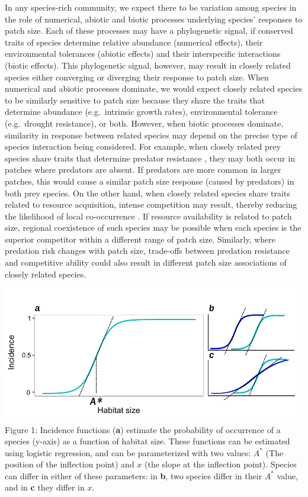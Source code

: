 In any species-rich community, we expect there to be variation among
species in the role of numerical, abiotic and biotic processes
underlying species' responses to patch size. Each of these processes may
have a phylogenetic signal, if conserved traits of species determine
relative abundance (numerical effects), their environmental tolerances
(abiotic effects) and their interspecific interactions (biotic effects).
This phylogenetic signal, however, may result in closely related species
either converging or diverging their response to patch size. When
numerical and abiotic processes dominate, we would expect closely
related species to be similarly sensitive to patch size because they
share the traits that determine abundance (e.g.~intrinsic growth rates),
environmental tolerance (e.g.~drought resistance), or both. However,
when biotic processes dominate, similarity in response between related
species may depend on the precise type of species interaction being
considered. For example, when closely related prey species share traits
that determine predator resistance \citep{Nyman2007}, they may both
occur in patches where predators are absent. If predators are more
common in larger patches, this would cause a similar patch size response
(caused by predators) in both prey species. On the other hand, when
closely related species share traits related to resource acquisition,
intense competition may result, thereby reducing the likelihood of local
co-occurrence \citep{Webb2002}. If resource availability is related to
patch size, regional coexistence of such species may be possible when
each species is the superior competitor within a different range of
patch size. Similarly, where predation risk changes with patch size,
trade-offs between predation resistance and competitive ability could
also result in different patch size associations of closely related
species.

\includegraphics{figures/illustration.pdf}\\
Figure 1: Incidence functions (\textbf{a}) estimate the probability of
occurrence of a species (y-axis) as a function of habitat size. These
functions can be estimated using logistic regression, and can be
parameterized with two values: \(A^{*}\) (The position of the inflection
point) and \(x\) (the slope at the inflection point). Species can differ
in either of these parameters: in \textbf{b}, two species differ in
their \(A^{*}\) value, and in \textbf{c} they differ in \(x\).

